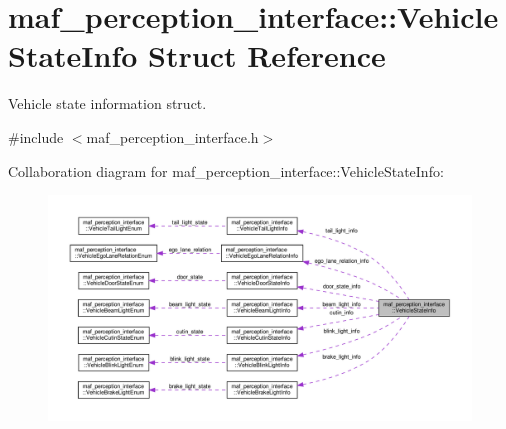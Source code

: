 \hypertarget{structmaf__perception__interface_1_1VehicleStateInfo}{}\section{maf\+\_\+perception\+\_\+interface\+:\+:Vehicle\+State\+Info Struct Reference}
\label{structmaf__perception__interface_1_1VehicleStateInfo}


Vehicle state information struct.  




{\ttfamily \#include $<$maf\+\_\+perception\+\_\+interface.\+h$>$}



Collaboration diagram for maf\+\_\+perception\+\_\+interface\+:\+:Vehicle\+State\+Info\+:\nopagebreak
\begin{figure}[H]
\begin{center}
\leavevmode
\includegraphics[width=350pt]{structmaf__perception__interface_1_1VehicleStateInfo__coll__graph}
\end{center}
\end{figure}
